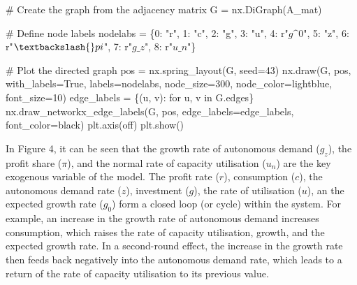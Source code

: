 \documentclass[
  letterpaper,
  DIV=11,
  numbers=noendperiod]{scrreprt}
\newenvironment{Shaded}{\begin{snugshade}}{\end{snugshade}}
\newcommand{\CommentTok}[1]{\textcolor[rgb]{0.37,0.37,0.37}{#1}}
\newcommand{\ControlFlowTok}[1]{\textcolor[rgb]{0.00,0.23,0.31}{#1}}
\newcommand{\DecValTok}[1]{\textcolor[rgb]{0.68,0.00,0.00}{#1}}
\newcommand{\KeywordTok}[1]{\textcolor[rgb]{0.00,0.23,0.31}{#1}}
\newcommand{\NormalTok}[1]{\textcolor[rgb]{0.00,0.23,0.31}{#1}}
\newcommand{\OperatorTok}[1]{\textcolor[rgb]{0.37,0.37,0.37}{#1}}
\newcommand{\StringTok}[1]{\textcolor[rgb]{0.13,0.47,0.30}{#1}}
\newcommand{\VariableTok}[1]{\textcolor[rgb]{0.07,0.07,0.07}{#1}}
\newcommand{\VerbatimStringTok}[1]{\textcolor[rgb]{0.13,0.47,0.30}{#1}}
\begin{document}
\begin{tcolorbox}
\begin{Shaded}
\begin{Highlighting}[]
\CommentTok{\# Create the graph from the adjacency matrix}
\NormalTok{G }\OperatorTok{=}\NormalTok{ nx.DiGraph(A\_mat)}

\CommentTok{\# Define node labels}
\NormalTok{nodelabs }\OperatorTok{=}\NormalTok{ \{}\DecValTok{0}\NormalTok{: }\StringTok{"r"}\NormalTok{, }
            \DecValTok{1}\NormalTok{: }\StringTok{"c"}\NormalTok{,}
            \DecValTok{2}\NormalTok{: }\StringTok{"g"}\NormalTok{,}
            \DecValTok{3}\NormalTok{: }\StringTok{"u"}\NormalTok{,}
            \DecValTok{4}\NormalTok{: }\VerbatimStringTok{r"$g\^{}0$"}\NormalTok{,}
            \DecValTok{5}\NormalTok{: }\StringTok{"z"}\NormalTok{,}
            \DecValTok{6}\NormalTok{: }\VerbatimStringTok{r"$\textbackslash{}pi$"}\NormalTok{,}
            \DecValTok{7}\NormalTok{: }\VerbatimStringTok{r"$g\_z$"}\NormalTok{,}
            \DecValTok{8}\NormalTok{: }\VerbatimStringTok{r"$u\_n$"}\NormalTok{\}}

\CommentTok{\# Plot the directed graph}
\NormalTok{pos }\OperatorTok{=}\NormalTok{ nx.spring\_layout(G, seed}\OperatorTok{=}\DecValTok{43}\NormalTok{)  }
\NormalTok{nx.draw(G, pos, with\_labels}\OperatorTok{=}\VariableTok{True}\NormalTok{, labels}\OperatorTok{=}\NormalTok{nodelabs, node\_size}\OperatorTok{=}\DecValTok{300}\NormalTok{, node\_color}\OperatorTok{=}\StringTok{\textquotesingle{}lightblue\textquotesingle{}}\NormalTok{, }
\NormalTok{        font\_size}\OperatorTok{=}\DecValTok{10}\NormalTok{)}
\NormalTok{edge\_labels }\OperatorTok{=}\NormalTok{ \{(u, v): }\StringTok{\textquotesingle{}\textquotesingle{}} \ControlFlowTok{for}\NormalTok{ u, v }\KeywordTok{in}\NormalTok{ G.edges\}}
\NormalTok{nx.draw\_networkx\_edge\_labels(G, pos, edge\_labels}\OperatorTok{=}\NormalTok{edge\_labels, font\_color}\OperatorTok{=}\StringTok{\textquotesingle{}black\textquotesingle{}}\NormalTok{)}
\NormalTok{plt.axis(}\StringTok{\textquotesingle{}off\textquotesingle{}}\NormalTok{)}
\NormalTok{plt.show()}
\end{Highlighting}
\end{Shaded}

\end{tcolorbox}

In Figure 4, it can be seen that the growth rate of autonomous demand
(\(g_z\)), the profit share (\(\pi\)), and the normal rate of capacity
utilisation (\(u_n\)) are the key exogenous variable of the model. The
profit rate (\(r\)), consumption (\(c\)), the autonomous demand rate
(\(z\)), investment (\(g\)), the rate of utilisation (\(u\)), an the
expected growth rate (\(g_0\)) form a closed loop (or cycle) within the
system. For example, an increase in the growth rate of autonomous demand
increases consumption, which raises the rate of capacity utilisation,
growth, and the expected growth rate. In a second-round effect, the
increase in the growth rate then feeds back negatively into the
autonomous demand rate, which leads to a return of the rate of capacity
utilisation to its previous value.
\end{document}
